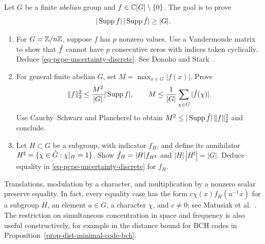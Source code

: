 \begin{exo}
\label{exo-principle-uncertainty-discrete}
Let $G$ be a finite \emph{abelian} group and $f\in\mathbb{C}[G]\setminus\{0\}$.
The goal is to prove
\begin{equation}
\label{eq-pcpe-uncertainty-discrete}
 |\operatorname{Supp} f|\,|\operatorname{Supp}\hat{f}|\geq|G|.
\end{equation}
\begin{enumerate}
\item For $G=\mathbb{Z}/n\mathbb{Z}$, suppose $f$ has $p$ nonzero values. Use a
Vandermonde matrix to show that $\hat{f}$ cannot have $p$ consecutive zeros
with indices taken cyclically. Deduce \eqref{eq-pcpe-uncertainty-discrete}.
See Donoho and Stark~\cite{donoho-stark-uncertainty}.
\item For general finite abelian $G$, set $M=\max_{x\in G}|f(x)|$.
Prove
\[
 \lVert f\rVert_2^2\leq\frac{M^2}{|G|}|\operatorname{Supp} f|,
 \qquad M\leq\frac1{|G|}\sum_{\chi\in\hat{G}}|\hat{f}(\chi)|.
\]
Use Cauchy--Schwarz and Plancherel to obtain
$M^2\leq|\operatorname{Supp}\hat{f}|\,\lVert f\rVert_2^2$ and conclude.
\item Let $H\subset G$ be a subgroup, with indicator $f_H$, and define its
annihilator $H^\sharp=\{\chi\in\hat{G}:\chi|_H=1\}$.
Show $\hat{f}_H=|H|f_{H^\sharp}$ and $|H|\,|H^\sharp|=|G|$.
Deduce equality in \eqref{eq-pcpe-uncertainty-discrete} for $f_H$.
\end{enumerate}
Translations, modulation by a character, and multiplication by a nonzero
scalar preserve equality. In fact, every equality case has the form
$c\chi(x)f_H(a^{-1}x)$ for a subgroup $H$, an element $a\in G$, a character
$\chi$, and $c\neq0$; see Matusiak et al.~\cite{matusiak-donoho-stark}.
The restriction on simultaneous concentration in space and frequency is also
useful constructively, for example in the distance bound for BCH codes in
Proposition~\ref{prop-dist-minimal-code-bch}.
\end{exo}


